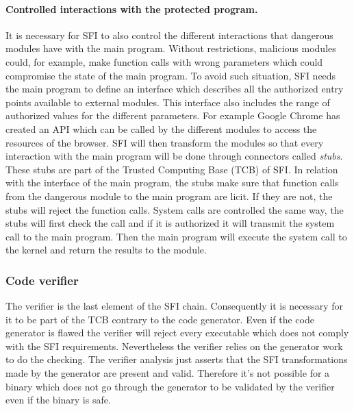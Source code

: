 \documentclass[11pt]{sdm}
\begin{document}
\paragraph{Controlled interactions with the protected program.}
\label{par:Controled interactions with the protected program}

	It is necessary for SFI to also control the different interactions that dangerous modules have with the main program. Without restrictions, malicious modules could, for example, make function calls with wrong parameters which could compromise the state of the main program. 
To avoid such situation, SFI needs the main program to define an interface which describes all the authorized entry points available to external modules. This interface also includes the range of authorized values for the different parameters. 
For example Google Chrome has created an API which can be called by the different modules to access the resources of the browser.
SFI will then transform the modules so that every interaction with the main program will be done through connectors called \textit{stubs}. These stubs are part of the Trusted Computing Base (TCB) of SFI. In relation with the interface of the main program, the stubs make sure that function calls from the dangerous module to the main program are licit. If they are not, the stubs will reject the function calls. 
System calls are controlled the same way, the stubs will first check the call and if it is authorized it will transmit the system call to the main program. Then the main program will execute the system call to the kernel and return the results to the module.

\subsubsection{Code verifier}
\label{ssub:Code verifier}
The verifier is the last element of the SFI chain. Consequently it is necessary for it to be part of the TCB contrary to the code generator. Even if the code generator is flawed the verifier will reject every executable which does not comply with the SFI requirements. Nevertheless the verifier relies on the generator work to do the checking. The verifier analysis just asserts that the SFI transformations made by the generator are present and valid. Therefore it's not possible for a binary which does not go through the generator to be validated by the verifier even if the binary is safe.
\end{document}
